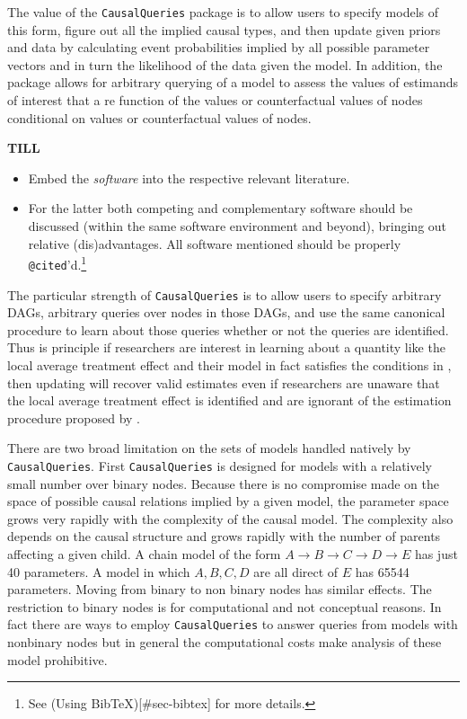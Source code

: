 \documentclass[
  11pt,
  article]{jss}
\begin{document}
The value of the \texttt{CausalQueries} package is to allow users to
specify models of this form, figure out all the implied causal types,
and then update given priors and data by calculating event probabilities
implied by all possible parameter vectors and in turn the likelihood of
the data given the model. In addition, the package allows for arbitrary
querying of a model to assess the values of estimands of interest that a
re function of the values or counterfactual values of nodes conditional
on values or counterfactual values of nodes.

\textbf{TILL}

\begin{itemize}
\item
  Embed the \emph{software} into the respective relevant literature.
\item
  For the latter both competing and complementary software should be
  discussed (within the same software environment and beyond), bringing
  out relative (dis)advantages. All software mentioned should be
  properly \texttt{@cited}'d.\footnote{See (Using
    BibTeX){[}\#sec-bibtex{]} for more details.}
\end{itemize}

The particular strength of \texttt{CausalQueries} is to allow users to
specify arbitrary DAGs, arbitrary queries over nodes in those DAGs, and
use the same canonical procedure to learn about those queries whether or
not the queries are identified. Thus is principle if researchers are
interest in learning about a quantity like the local average treatment
effect and their model in fact satisfies the conditions in
\citet{angrist1996identification}, then updating will recover valid
estimates even if researchers are unaware that the local average
treatment effect is identified and are ignorant of the estimation
procedure proposed by \citet{angrist1996identification}.

There are two broad limitation on the sets of models handled natively by
\texttt{CausalQueries}. First \texttt{CausalQueries} is designed for
models with a relatively small number over binary nodes. Because there
is no compromise made on the space of possible causal relations implied
by a given model, the parameter space grows very rapidly with the
complexity of the causal model. The complexity also depends on the
causal structure and grows rapidly with the number of parents affecting
a given child. A chain model of the form
\(A \rightarrow B \rightarrow C \rightarrow D \rightarrow E\) has just
40 parameters. A model in which \(A, B, C, D\) are all direct of \(E\)
has 65544 parameters. Moving from binary to non binary nodes has similar
effects. The restriction to binary nodes is for computational and not
conceptual reasons. In fact there are ways to employ
\texttt{CausalQueries} to answer queries from models with nonbinary
nodes but in general the computational costs make analysis of these
model prohibitive.
\end{document}
